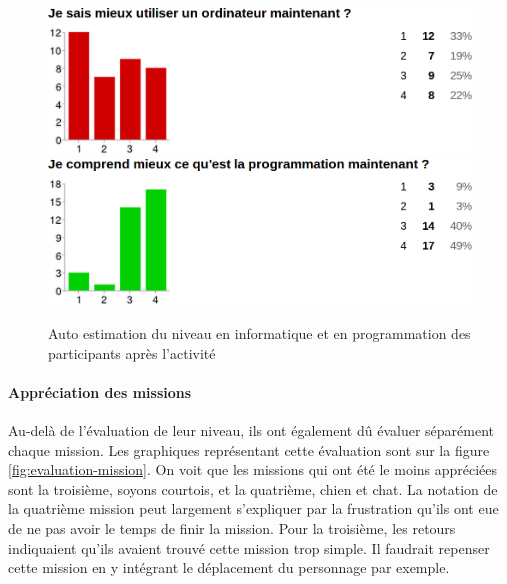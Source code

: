 \begin{figure}[ht]
  \begin{center}
    \includegraphics[scale=0.3]{content/8-validation/images/apres}
    \includegraphics[scale=0.3]{content/8-validation/images/apres-programmation}
    \caption{Auto estimation du niveau en informatique et en programmation des participants après l'activité}
    \label{fig:niveau-apres}
  \end{center}
\end{figure}

\paragraph{Appréciation des missions}
\label{appreciation}
Au-delà de l'évaluation de leur niveau, ils ont également dû évaluer séparément chaque mission. Les graphiques représentant cette évaluation sont sur la figure \ref{fig:evaluation-mission}. On voit que les missions qui ont été le moins appréciées sont la troisième, soyons courtois, et la quatrième, chien et chat. La notation de la quatrième mission peut largement s'expliquer par la frustration qu'ils ont eue de ne pas avoir le temps de finir la mission. Pour la troisième, les retours indiquaient qu'ils avaient trouvé cette mission trop simple. Il faudrait repenser cette mission en y intégrant le déplacement du personnage par exemple.\\


